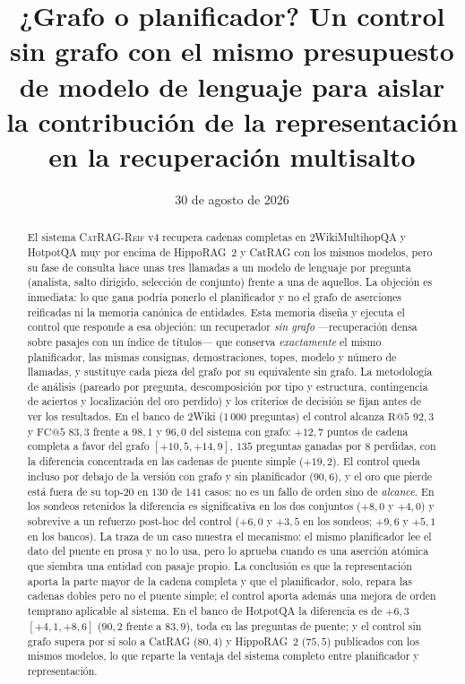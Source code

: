 \documentclass[11pt,a4paper]{article}
\title{¿Grafo o planificador? Un control sin grafo con el mismo presupuesto
de modelo de lenguaje para aislar la contribución de la representación en
la recuperación multisalto}
\author{}
\date{30 de agosto de 2026}
\newcommand{\sys}{\textsc{CatRAG-Reif}}
\newcommand{\hippo}{HippoRAG~2}
\begin{document}
\maketitle
\vspace{-2.5em}

\begin{abstract}
\noindent
El sistema \sys{} v4 recupera cadenas completas en 2WikiMultihopQA y HotpotQA
muy por encima de \hippo{} y CatRAG con los mismos modelos, pero su fase de
consulta hace unas tres llamadas a un modelo de lenguaje por pregunta
(analista, salto dirigido, selección de conjunto) frente a una de aquellos.
La objeción es inmediata: lo que gana podría ponerlo el planificador y no el
grafo de aserciones reificadas ni la memoria canónica de entidades. Esta
memoria diseña y ejecuta el control que responde a esa objeción: un
recuperador \emph{sin grafo} ---recuperación densa sobre pasajes con un
índice de títulos--- que conserva \emph{exactamente} el mismo planificador,
las mismas consignas, demostraciones, topes, modelo y número de llamadas, y
sustituye cada pieza del grafo por su equivalente sin grafo. La metodología
de análisis (pareado por pregunta, descomposición por tipo y estructura,
contingencia de aciertos y localización del oro perdido) y los criterios de
decisión se fijan antes de ver los resultados. En el banco de 2Wiki
($1\,000$ preguntas) el control alcanza $\mathrm{R@}5$ $92{,}3$ y
$\mathrm{FC@}5$ $83{,}3$ frente a $98{,}1$ y $96{,}0$ del sistema con
grafo: $+12{,}7$ puntos de cadena completa a favor del grafo
$[+10{,}5,+14{,}9]$, $135$ preguntas ganadas por $8$ perdidas, con la
diferencia concentrada en las cadenas de puente simple ($+19{,}2$). El
control queda incluso por debajo de la versión con grafo y sin planificador
($90{,}6$), y el oro que pierde está fuera de su top-20 en $130$ de $141$
casos: no es un fallo de orden sino de \emph{alcance}. En los sondeos
retenidos la diferencia es significativa en los dos conjuntos ($+8{,}0$ y
$+4{,}0$) y sobrevive a un refuerzo post-hoc del control ($+6{,}0$ y
$+3{,}5$ en los sondeos; $+9{,}6$ y $+5{,}1$ en los bancos). La traza de un caso muestra el mecanismo: el mismo planificador
lee el dato del puente en prosa y no lo usa, pero lo aprueba cuando es una
aserción atómica que siembra una entidad con pasaje propio. La conclusión es
que la representación aporta la parte mayor de la cadena completa y que el
planificador, solo, repara las cadenas dobles pero no el puente simple; el
control aporta además una mejora de orden temprano aplicable al sistema.
En el banco de HotpotQA la diferencia es de $+6{,}3$ $[+4{,}1,+8{,}6]$
($90{,}2$ frente a $83{,}9$), toda en las preguntas de puente; y el control
sin grafo supera por sí solo a CatRAG ($80{,}4$) y \hippo{} ($75{,}5$)
publicados con los mismos modelos, lo que reparte la ventaja del sistema
completo entre planificador y representación.
\end{abstract}
\end{document}
